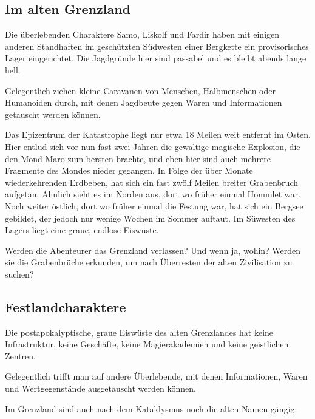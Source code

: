 \documentclass[11pt]{wbzine}
\begin{document}
\begin{multicols}{2}

\section{Im alten Grenzland}

    Die überlebenden Charaktere Samo, Liskolf und Fardir haben mit
    einigen anderen Standhaften im geschützten Südwesten einer
    Bergkette ein provisorisches Lager eingerichtet. Die Jagdgründe
    hier sind passabel und es bleibt abends lange hell.

    Gelegentlich ziehen kleine Caravanen von Menschen, Halbmenschen
    oder Humanoiden durch, mit denen Jagdbeute gegen Waren und
    Informationen getauscht werden können. 


    Das Epizentrum der Katastrophe liegt nur etwa 18 Meilen weit
    entfernt im Osten. Hier entlud sich vor nun fast zwei Jahren die
    gewaltige magische Explosion, die den Mond Maro zum bersten
    brachte, und eben hier sind auch mehrere Fragmente des Mondes
    nieder gegangen. In Folge der über Monate wiederkehrenden
    Erdbeben, hat sich ein fast zwölf Meilen breiter Grabenbruch
    aufgetan. Ähnlich sieht es im Norden aus, dort wo früher einmal
    Hommlet war. Noch weiter östlich, dort wo früher einmal die
    Festung war, hat sich ein Bergsee gebildet, der jedoch nur
    wenige Wochen im Sommer auftaut. Im Süwesten des Lagers liegt
    eine graue, endlose Eiswüste.

    Werden die Abenteurer das Grenzland verlassen? Und wenn ja,
    wohin? Werden sie die Grabenbrüche erkunden, um nach Überresten
    der alten Zivilisation zu suchen?

\subsection{Festlandcharaktere}

\begin{tcolorbox}
Die postapokalyptische, graue Eiswüste des alten Grenzlandes hat
keine Infrastruktur, keine Geschäfte, keine Magierakademien und
keine geistlichen Zentren. 
\end{tcolorbox}

Gelegentlich trifft man auf andere
Überlebende, mit denen Informationen, Waren und Wertgegenstände 
ausgetauscht werden können. 

Im Grenzland sind auch nach dem Kataklysmus noch die alten Namen
gängig:


\end{multicols}
\end{document}
